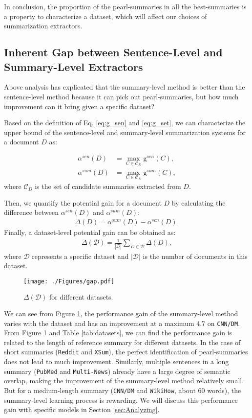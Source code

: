 In conclusion, the proportion of the pearl-summaries in all the best-summaries is a property to characterize a dataset, which will affect our choices of summarization extractors.

\subsection{Inherent Gap between Sentence-Level and Summary-Level Extractors}
\label{sec:inherent gap}
Above analysis has explicated that the summary-level method is better than the sentence-level method because it can pick out pearl-summaries, but how much improvement can it bring given a specific dataset?

Based on the definition of Eq. \eqref{eq:g_sen} and \eqref{eq:g_set}, we can characterize the upper bound of the sentence-level and summary-level summarization systems for a document $D$ as:

\begin{align}
    \alpha^{sen}(D) &= \max_{C\in \mathcal{C}_D}\mathrm{g}^{sen}(C), \\
    \alpha^{sum}(D) &= \max_{C\in \mathcal{C}_D}\mathrm{g}^{sum}(C),
\end{align}
where $\mathcal{C}_D$ is the set of candidate summaries extracted from $D$.

Then, we quantify the potential gain for a document $D$  by calculating the difference between $\alpha^{sen}(D)$ and $\alpha^{sum}(D)$:
\begin{align}
    \Delta(D) = \alpha^{sum}(D) - \alpha^{sen}(D).
\end{align}
Finally, a dataset-level potential gain can be obtained as:
\begin{align}
    \Delta(\mathcal{D}) = \frac{1}{|\mathcal{D}|}\sum_{D\in \mathcal{D}}\Delta(D),
\end{align}
where $\mathcal{D}$ represents a specific dataset and $|\mathcal{D}|$ is the number of documents in this dataset.

\begin{figure}[t]
    \centering
    \texttt{[image: ./Figures/gap.pdf]}
    \caption{$\Delta(\mathcal{D})$ for different datasets.}
    \label{fig:delta}
\end{figure}

We can see from Figure \ref{fig:delta}, the performance gain of the summary-level method varies with the dataset and has an improvement at a maximum 4.7 on \texttt{CNN/DM}. From Figure \ref{fig:delta} and Table \ref{tab:datasets}, we can find the performance gain is related to the length of reference summary for different datasets. In the case of short summaries (\texttt{Reddit} and \texttt{XSum}), the perfect identification of pearl-summaries does not lead to much improvement. Similarly, multiple sentences in a long summary (\texttt{PubMed} and \texttt{Multi-News}) already have a large degree of semantic overlap, making the improvement of the summary-level method relatively small. But for a medium-length summary (\texttt{CNN/DM} and \texttt{WikiHow}, about 60 words), the summary-level learning process is rewarding. We will discuss this performance gain with specific models in Section \ref{sec:Analyzing}.

